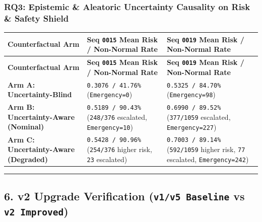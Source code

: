 \documentclass[10.5pt,a4paper]{article}
\begin{document}
\subsubsection{RQ3: Epistemic \& Aleatoric Uncertainty Causality on Risk \& Safety Shield}

\begin{footnotesize}
\setlength{\tabcolsep}{4pt}
\setlength{\LTleft}{0pt}\setlength{\LTright}{0pt}
\begin{longtable}{>{\raggedright\arraybackslash}p{} >{\raggedright\arraybackslash}p{} >{\raggedright\arraybackslash}p{}}
\toprule
\textbf{Counterfactual Arm} & \textbf{Seq \texttt{0015} Mean Risk / Non-Normal Rate} & \textbf{Seq \texttt{0019} Mean Risk / Non-Normal Rate} \\
\midrule
\endfirsthead
\toprule
\textbf{Counterfactual Arm} & \textbf{Seq \texttt{0015} Mean Risk / Non-Normal Rate} & \textbf{Seq \texttt{0019} Mean Risk / Non-Normal Rate} \\
\midrule
\endhead
\bottomrule
\endfoot
\textbf{Arm A: Uncertainty-Blind} & \texttt{0.\allowbreak{}3076 /\allowbreak{} 41.\allowbreak{}76\%} (\texttt{Emergency=0}) & \texttt{0.\allowbreak{}5325 /\allowbreak{} 84.\allowbreak{}70\%} (\texttt{Emergency=98}) \\
\textbf{Arm B: Uncertainty-Aware (Nominal)} & \texttt{0.\allowbreak{}5189 /\allowbreak{} 90.\allowbreak{}43\%} (\texttt{248/\allowbreak{}376} escalated, \texttt{Emergency=10}) & \texttt{0.\allowbreak{}6990 /\allowbreak{} 89.\allowbreak{}52\%} (\texttt{377/\allowbreak{}1059} escalated, \texttt{Emergency=227}) \\
\textbf{Arm C: Uncertainty-Aware (Degraded)} & \texttt{0.\allowbreak{}5428 /\allowbreak{} 90.\allowbreak{}96\%} (\texttt{254/\allowbreak{}376} higher risk, \texttt{23} escalated) & \texttt{0.\allowbreak{}7003 /\allowbreak{} 89.\allowbreak{}14\%} (\texttt{592/\allowbreak{}1059} higher risk, \texttt{77} escalated, \texttt{Emergency=242}) \\
\end{longtable}
\end{footnotesize}


\par\noindent\rule{\textwidth}{0.4pt}\par\medskip

\subsection{6. v2 Upgrade Verification (\texttt{v1/\allowbreak{}v5 Baseline} vs \texttt{v2 Improved})}
\end{document}
